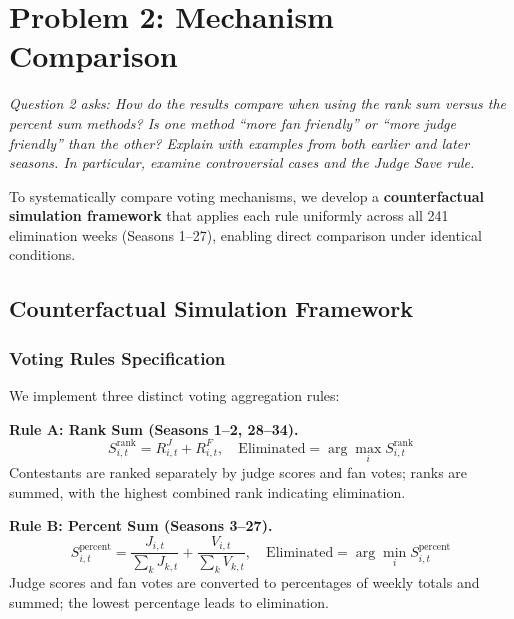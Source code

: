 \documentclass{mcmthesis}
\begin{document}

\section{Problem 2: Mechanism Comparison}

\textit{Question 2 asks: How do the results compare when using the rank sum versus the percent sum methods? Is one method ``more fan friendly'' or ``more judge friendly'' than the other? Explain with examples from both earlier and later seasons. In particular, examine controversial cases and the Judge Save rule.}

To systematically compare voting mechanisms, we develop a \textbf{counterfactual simulation framework} that applies each rule uniformly across all 241 elimination weeks (Seasons 1--27), enabling direct comparison under identical conditions.

\subsection{Counterfactual Simulation Framework}

\subsubsection{Voting Rules Specification}

We implement three distinct voting aggregation rules:

\textbf{Rule A: Rank Sum (Seasons 1--2, 28--34).}
\begin{equation}
S^{\text{rank}}_{i,t} = R^{J}_{i,t} + R^{F}_{i,t}, \quad \text{Eliminated} = \arg\max_i S^{\text{rank}}_{i,t}
\end{equation}
Contestants are ranked separately by judge scores and fan votes; ranks are summed, with the highest combined rank indicating elimination.

\textbf{Rule B: Percent Sum (Seasons 3--27).}
\begin{equation}
S^{\text{percent}}_{i,t} = \frac{J_{i,t}}{\sum_k J_{k,t}} + \frac{V_{i,t}}{\sum_k V_{k,t}}, \quad \text{Eliminated} = \arg\min_i S^{\text{percent}}_{i,t}
\end{equation}
Judge scores and fan votes are converted to percentages of weekly totals and summed; the lowest percentage leads to elimination.
\end{document}
